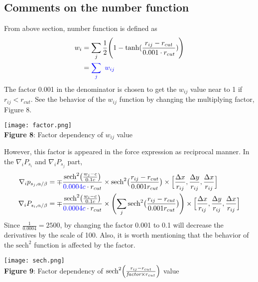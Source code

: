 \documentclass[11pt, oneside]{article}   	%
\begin{document}
\subsection{Comments on the number function}
From above section, number function is defined as 
\begin{align*}
w_i &= \sum_j  \frac{1}{2} \Biggl(1-\textrm{tanh}(\frac{r_{ij} - r_{cut}}{0.001 \cdot r_{cut}}) \Biggr)\\
&=\color{blue} \sum_j \ w_{ij}
\end{align*}
The factor 0.001 in the denominator is chosen to get the $w_{ij}$ value near to 1 if $r_{ij} < r_{cut}$. See the behavior of the $w_{ij}$ function by changing the multiplying factor, Figure 8.
\begin{center}
\texttt{[image: factor.png]} \\
\textbf{Figure 8}: Factor dependency of $w_{ij}$ value
\end{center}
However, this factor is appeared in the force expression as reciprocal manner. In the $\nabla_i P_{s_i}$ and $\nabla_i P_{s_j}$ part, 
\begin{align}
\nabla_i p_{s_j,\alpha/\beta} &= \mp \frac{\textrm{sech}^2 \bigl( \frac{w_j-c}{0.1c} \bigr)  }{{\color{blue}0.0004c}\cdot r_{cut}} \times \textrm{sech}^2 \bigl(\frac{r_{ij}-r_{cut}}{0.001r_{cut}}\bigr)  \times \Big[\frac{\Delta x}{r_{ij}}, \frac{\Delta y}{r_{ij}}, \frac{\Delta x}{r_{ij}}\Big]  \\
\nabla_i {P_{s_i,\alpha/\beta}}  &= \mp \frac{\textrm{sech}^2 \bigl( \frac{w_i-c}{0.1c} \bigr)  }{{\color{blue}0.0004c}\cdot r_{cut}} \times \Biggl( \sum_j \textrm{sech}^2 \bigl(\frac{r_{ij}-r_{cut}}{0.001r_{cut}}\bigr) \Biggr) \times \Big[\frac{\Delta x}{r_{ij}}, \frac{\Delta y}{r_{ij}}, \frac{\Delta x}{r_{ij}}\Big] 
\end{align}
Since $\frac{1}{0.0004} = 2500$, by changing the factor 0.001 to 0.1 will decrease the derivatives by the scale of 100. Also, it is worth mentioning that the behavior of the $\textrm{sech}^2$ function is affected by the factor.
\begin{center}
\texttt{[image: sech.png]} \\
\textbf{Figure 9}: Factor dependency of $\textrm{sech}^2 \Bigl(\frac{r_{ij}-r_{cut}}{\textit{factor}\times r_{cut}}\Bigr)$ value
\end{center}
\end{document}
